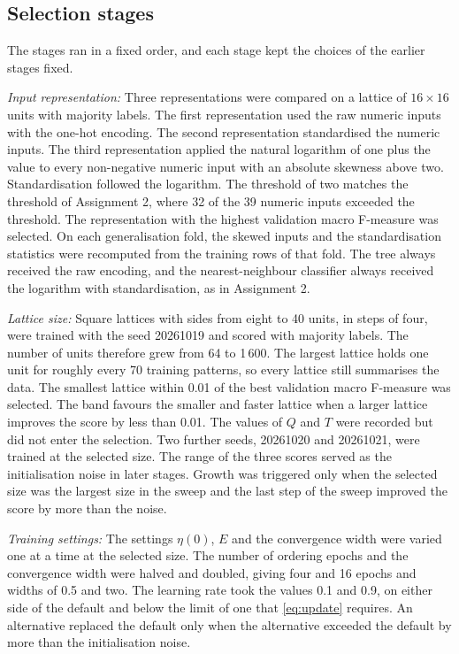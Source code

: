 \documentclass[conference,10pt]{IEEEtran}
\begin{document}
\subsection{Selection stages}
The stages ran in a fixed order, and each stage kept the choices of the earlier stages fixed.

\emph{Input representation:}
Three representations were compared on a lattice of $16\times16$ units with majority labels.
The first representation used the raw numeric inputs with the one-hot encoding.
The second representation standardised the numeric inputs.
The third representation applied the natural logarithm of one plus the value to every non-negative numeric input with an absolute skewness above two.
Standardisation followed the logarithm.
The threshold of two matches the threshold of Assignment 2, where 32 of the 39 numeric inputs exceeded the threshold.
The representation with the highest validation macro F-measure was selected.
On each generalisation fold, the skewed inputs and the standardisation statistics were recomputed from the training rows of that fold.
The tree always received the raw encoding, and the nearest-neighbour classifier always received the logarithm with standardisation, as in Assignment 2.

\emph{Lattice size:}
Square lattices with sides from eight to 40 units, in steps of four, were trained with the seed 20261019 and scored with majority labels.
The number of units therefore grew from 64 to 1\,600.
The largest lattice holds one unit for roughly every 70 training patterns, so every lattice still summarises the data.
The smallest lattice within 0.01 of the best validation macro F-measure was selected.
The band favours the smaller and faster lattice when a larger lattice improves the score by less than 0.01.
The values of $Q$ and $T$ were recorded but did not enter the selection.
Two further seeds, 20261020 and 20261021, were trained at the selected size.
The range of the three scores served as the initialisation noise in later stages.
Growth was triggered only when the selected size was the largest size in the sweep and the last step of the sweep improved the score by more than the noise.

\emph{Training settings:}
The settings $\eta(0)$, $E$ and the convergence width were varied one at a time at the selected size.
The number of ordering epochs and the convergence width were halved and doubled, giving four and 16 epochs and widths of 0.5 and two.
The learning rate took the values 0.1 and 0.9, on either side of the default and below the limit of one that \eqref{eq:update} requires.
An alternative replaced the default only when the alternative exceeded the default by more than the initialisation noise.
\end{document}
